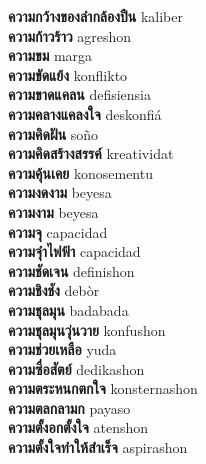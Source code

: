 \textbf{ ความกว้างของลำกล้องปืน  } kaliber \\
\textbf{ ความก้าวร้าว  } agreshon \\
\textbf{ ความขม  } marga \\
\textbf{ ความขัดแย้ง  } konflikto \\
\textbf{ ความขาดแคลน  } defisiensia \\
\textbf{ ความคลางแคลงใจ  } deskonfiá \\
\textbf{ ความคิดฝัน  } soño \\
\textbf{ ความคิดสร้างสรรค์  } kreatividat \\
\textbf{ ความคุ้นเคย  } konosementu \\
\textbf{ ความงดงาม  } beyesa \\
\textbf{ ความงาม  } beyesa \\
\textbf{ ความจุ  } capacidad \\
\textbf{ ความจุำไฟฟ้า  } capacidad \\
\textbf{ ความชัดเจน  } definishon \\
\textbf{ ความชิงชัง  } debòr \\
\textbf{ ความชุลมุน  } badabada \\
\textbf{ ความชุลมุนวุ่นวาย  } konfushon \\
\textbf{ ความช่วยเหลือ  } yuda \\
\textbf{ ความซื่อสัตย์  } dedikashon \\
\textbf{ ความตระหนกตกใจ  } konsternashon \\
\textbf{ ความตลกลามก  } payaso \\
\textbf{ ความตั้งอกตั้งใจ  } atenshon \\
\textbf{ ความตั้งใจทำให้สำเร็จ  } aspirashon \\
